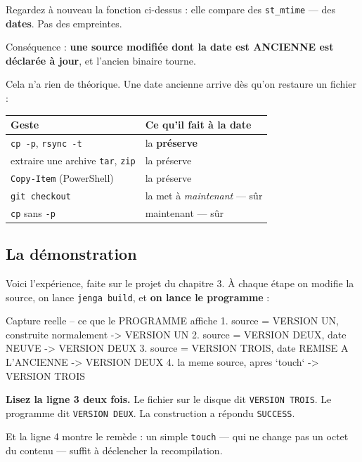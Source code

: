 \begin{nkpiege}
Regardez à nouveau la fonction ci-dessus : elle compare des
\texttt{st\_mtime} --- des \textbf{dates}. Pas des empreintes.

Conséquence : \textbf{une source modifiée dont la date est ANCIENNE est déclarée
à jour}, et l'ancien binaire tourne.

Cela n'a rien de théorique. Une date ancienne arrive dès qu'on restaure un
fichier :

\begin{center}
\begin{tabular}{@{}ll@{}}
\toprule
\textbf{Geste} & \textbf{Ce qu'il fait à la date} \\
\midrule
\texttt{cp -p}, \texttt{rsync -t} & la \textbf{préserve} \\
extraire une archive \texttt{tar}, \texttt{zip} & la préserve \\
\texttt{Copy-Item} (PowerShell) & la préserve \\
\texttt{git checkout} & la met à \emph{maintenant} --- sûr \\
\texttt{cp} sans \texttt{-p} & maintenant --- sûr \\
\bottomrule
\end{tabular}
\end{center}
\end{nkpiege}

\subsection*{La démonstration}

Voici l'expérience, faite sur le projet du chapitre 3. À chaque étape on modifie
la source, on lance \texttt{jenga build}, et \textbf{on lance le programme} :

\begin{nkcode}{Capture reelle -- ce que le PROGRAMME affiche}
1. source = VERSION UN, construite normalement       -> VERSION UN
2. source = VERSION DEUX, date NEUVE                 -> VERSION DEUX
3. source = VERSION TROIS, date REMISE A L'ANCIENNE  -> VERSION DEUX
4. la meme source, apres `touch`                     -> VERSION TROIS
\end{nkcode}

\begin{nkretenir}
\textbf{Lisez la ligne 3 deux fois.} Le fichier sur le disque dit
\texttt{VERSION TROIS}. Le programme dit \texttt{VERSION DEUX}. La construction
a répondu \texttt{SUCCESS}.

Et la ligne 4 montre le remède : un simple \texttt{touch} --- qui ne change pas
un octet du contenu --- suffit à déclencher la recompilation.
\end{nkretenir}

